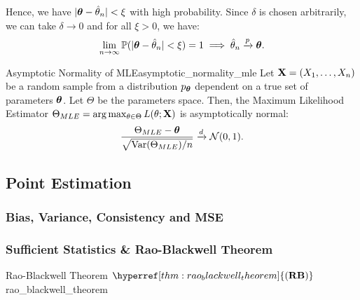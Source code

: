 \begin{proof*}
\begin{proof*}
    \noindent Hence, we have $|\boldsymbol{\theta}-\hat\theta_n|<\xi$ with high probability. Since $\delta$ is chosen arbitrarily, we can take $\delta\to0$ and for all $\xi>0$, we have: 
    \begin{align*}
        \lim_{n\to\infty}\mathbb{P}(|\boldsymbol{\theta}-\hat\theta_n|<\xi) = 1 \implies \hat\theta_n \xrightarrow{p} \boldsymbol{\theta}. 
    \end{align*} 
\end{proof*} 

\begin{proposition}{Asymptotic Normality of MLE}{asymptotic_normality_mle}
    Let ${\bf X}=(X_1, \dots, X_n)$ be a random sample from a distribution $p_{\boldsymbol{\theta}}$ dependent on a true set of parameters $\boldsymbol{\theta}$. Let $\Theta$ be the parameters space. Then, the Maximum Likelihood Estimator $\Theta_{MLE} = \arg\max_{\theta\in\Theta}L(\theta;{\bf X})$ is asymptotically normal:
    \begin{equation}
        \frac{\Theta_{MLE} - \boldsymbol{\theta}}{\sqrt{\mathrm{Var}(\Theta_{MLE})/n}} \xrightarrow{d} \mathcal{N}(0,1).
    \end{equation}
\end{proposition} 

\begin{proof*}
    
\end{proof*}

\subsection{Point Estimation}
\newcommand{\RB}{\hyperref[thm:rao_blackwell_theorem]{(\mathrm{{\bf RB}})}}
\newcommand{\CRLB}{\hyperref[thm:cramer_rao_lowerbound]{(\mathrm{{\bf CRLB}})}}

\subsubsection{Bias, Variance, Consistency and MSE}

\subsubsection{Sufficient Statistics \& Rao-Blackwell Theorem}
\begin{theorem}{Rao-Blackwell Theorem $\RB$}{rao_blackwell_theorem}
     
\end{theorem}



\end{proof*}
